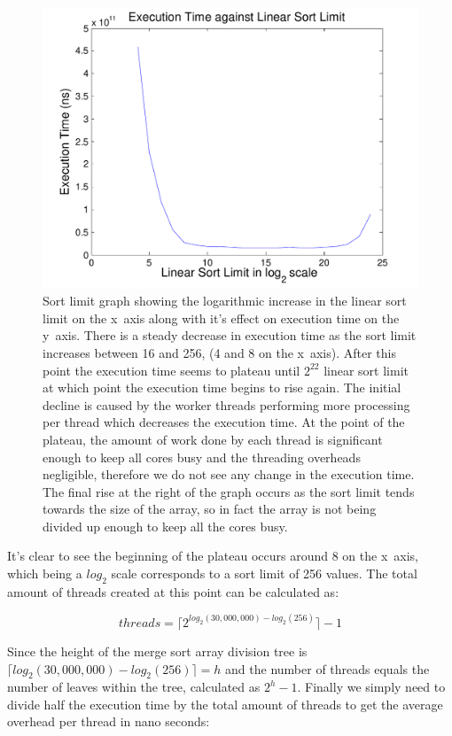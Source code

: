 \documentclass[12pt,twoside,notitlepage]{report}
\begin{document}
\begin{figure}[h!]
\includegraphics[width=\linewidth]{sort_limit_graph}
\caption[Merge Sort Linear Sort Limit Graph]{Sort limit graph showing the logarithmic increase in the linear sort limit on the x~axis along with it's effect on execution time on the y~axis. There is a steady decrease in execution time as the sort limit increases between
16 and 256, (4 and 8 on the x~axis). After this point the execution time seems to plateau until $2^{22}$ linear sort limit at which point the execution time begins to rise again. The initial decline is caused by the worker threads
performing more processing per thread which decreases the execution time. At the point of the plateau, the amount of work done by each thread is significant enough to keep all cores busy and the threading overheads negligible,
therefore we do not see any change in the execution time. The final rise at the right of the graph occurs as the sort limit tends towards the size of the array, so in fact the array is not being divided up enough to keep all the cores
busy.}
\label{fig:sort_limit_graph}
\end{figure}

It's clear to see the beginning of the plateau occurs around 8 on the x~axis, which being a $log_{2}$ scale corresponds to a sort limit of 256 values. The total amount of threads created at this point can be calculated as:

\[ threads = \lceil2^{log_{2}(30,000,000) - log_{2}(256)}\rceil - 1\]

Since the height of the merge sort array division tree is $\lceil log_{2}(30,000,000) - log_{2}(256)\rceil = h$ and the number of threads equals the number of leaves within the tree, calculated as $2^{h}-1$. Finally we simply need to
divide half the execution time by the total amount of threads to get the average overhead per thread in nano seconds:
\end{document}
